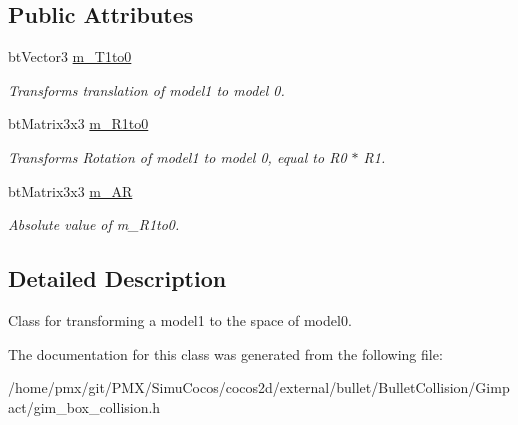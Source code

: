 \subsection*{Public Attributes}
\begin{DoxyCompactItemize}
\item 
\mbox{\label{classGIM__BOX__BOX__TRANSFORM__CACHE_af6aacf8817de360554f57799db41c8b4}} 
bt\+Vector3 \hyperlink{classGIM__BOX__BOX__TRANSFORM__CACHE_af6aacf8817de360554f57799db41c8b4}{m\+\_\+\+T1to0}
\begin{DoxyCompactList}\small\item\em Transforms translation of model1 to model 0. \end{DoxyCompactList}\item 
\mbox{\label{classGIM__BOX__BOX__TRANSFORM__CACHE_a97597f0d242e71eb8ad458838428aa09}} 
bt\+Matrix3x3 \hyperlink{classGIM__BOX__BOX__TRANSFORM__CACHE_a97597f0d242e71eb8ad458838428aa09}{m\+\_\+\+R1to0}
\begin{DoxyCompactList}\small\item\em Transforms Rotation of model1 to model 0, equal to R0\textquotesingle{} $\ast$ R1. \end{DoxyCompactList}\item 
\mbox{\label{classGIM__BOX__BOX__TRANSFORM__CACHE_ac6241a28e1c1c1e4a581ba547e30409e}} 
bt\+Matrix3x3 \hyperlink{classGIM__BOX__BOX__TRANSFORM__CACHE_ac6241a28e1c1c1e4a581ba547e30409e}{m\+\_\+\+AR}
\begin{DoxyCompactList}\small\item\em Absolute value of m\+\_\+\+R1to0. \end{DoxyCompactList}\end{DoxyCompactItemize}


\subsection{Detailed Description}
Class for transforming a model1 to the space of model0. 

The documentation for this class was generated from the following file\+:\begin{DoxyCompactItemize}
\item 
/home/pmx/git/\+P\+M\+X/\+Simu\+Cocos/cocos2d/external/bullet/\+Bullet\+Collision/\+Gimpact/gim\+\_\+box\+\_\+collision.\+h\end{DoxyCompactItemize}
